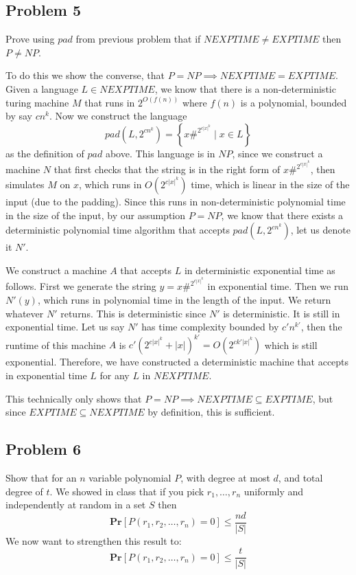 \documentclass[english]{article}
\begin{document}
\subsection*{Problem 5}
Prove using $pad$ from previous problem that if $NEXPTIME \neq EXPTIME$ then $P \neq NP$. 

To do this we show the converse, that $P = NP \implies NEXPTIME = EXPTIME$. Given a language $L \in NEXPTIME$, we
know that there is a non-deterministic turing machine $M$ that runs in $2^{O(f(n))}$ where $f(n)$ is a polynomial,
bounded by say $c n^k$. Now we construct the language
\[ pad(L,2^{c n^k}) = \left\{ x\#^{2^{c |x|^k}} \mid x \in L \right\} \]
as the definition of $pad$ above. This language is in $NP$, since we construct a machine $N$ that first checks that
the string is in the right form of $x\#^{2^{c |x|^k}}$, then simulates $M$ on $x$, which runs in $O(2^{c |x|^k})$
time, which is linear in the size of the input (due to the padding). Since this runs in non-deterministic polynomial
time in the size of the input, by our assumption $P = NP$, we know that there exists a deterministic polynomial time
algorithm that accepts $pad(L,2^{c n^k})$, let us denote it $N'$.

We construct a machine $A$ that accepts $L$ in deterministic exponential time as follows. First we generate the
string $y = x\#^{2^{c |x|^k}}$ in exponential time. Then we run $N'(y)$, which runs in polynomial time in 
the length of the input. We return whatever $N'$ returns. This is deterministic since $N'$ is deterministic. It
is still in exponential time. Let us say $N'$ has time complexity bounded by $c' n^{k'}$, then the runtime of this
machine $A$ is $c'\left(2^{c |x|^k} + |x|\right)^{k'} = O(2^{ck' |x|^k})$ which is still exponential. Therefore,
we have constructed a deterministic machine that accepts in exponential time $L$ for any $L$ in $NEXPTIME$.

This technically only shows that $P = NP \implies NEXPTIME \subseteq EXPTIME$, but since
$EXPTIME \subseteq NEXPTIME$ by definition, this is sufficient. 

\subsection*{Problem 6}
Show that for an $n$ variable polynomial $P$, with degree at most $d$, and total degree of $t$. We showed in class
that if you pick $r_1, \ldots, r_n$ uniformly and independently at random in a set $S$ then 
\[ \mathbf{Pr}[P(r_1,r_2,\ldots,r_n) = 0] \le \frac{nd}{|S|} \]
We now want to strengthen this result to:
\[ \mathbf{Pr}[P(r_1,r_2,\ldots,r_n) = 0] \le \frac{t}{|S|} \]
\end{document}
